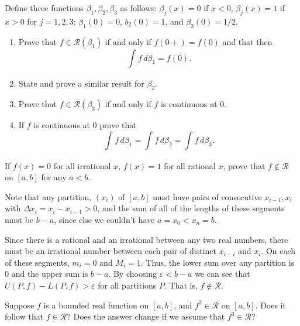 \documentclass[12 pt, letterpaper]{hmcpset}
\begin{document}
\begin{problem}[3.]
	Define three functions  $\beta_{1}, \beta_{2}, \beta_{3}$ as follows: $\beta_{j}(x) = 0$ if $x < 0$, $\beta_{j}(x) = 1$ if $x > 0$ for  $j = 1, 2, 3$; $\beta_{1}(0) = 0$, $b_{2}(0) = 1$, and $\beta_{3}(0) = 1/2$.
	\begin{enumerate}
		\item Prove that $f \in \mathscr{R}(\beta_{1})$ if and only if $f(0+) = f(0)$ and that then
			\[
				\int_{} f \, d\beta_{1} = f(0).
			\]
		\item State and prove a similar result for $\beta_{2}$.
		\item Prove that $f \in \mathscr{R}(\beta_{3})$ if and only if $f$ is continuous at $0$.
		\item If $f$ is continuous at $0$ prove that
			\[
				\int_{} f \, d\beta_{1} = \int_{} f \, d\beta_{2} = \int_{} f \, d\beta_{3}.
			\]
	\end{enumerate}
\end{problem}

\pagebreak

\begin{problem}[4. $\star$]
	If $f(x) = 0$ for all irrational $x$, $f(x) = 1$ for all rational $x$, prove that $f \notin \mathscr{R}$ on $[a, b]$ for any $a < b$.
\end{problem}

\begin{solution}
	Note that any partition, $(x_{i})$ of $[a, b]$ must have pairs of consecutive $x_{i - 1}, x_{i}$ with $\Delta x_{i} = x_{i} - x_{i - 1} > 0$, and the sum of all of the lengths of these segments must be $b - a$, since else we couldn't have $a = x_{0} < x_{n} = b$.

	Since there is a rational and an irrational between any two real numbers, there must be an irrational number between each pair of distinct $x_{i - i}$ and $x_{i}$. On each of these segments, $m_{i} = 0$ and $M_{i} = 1$. Thus, the lower sum over any partition is $0$ and the upper sum is $b - a$. By choosing $\varepsilon < b - a$ we can see that $U(P, f) - L(P, f) > \varepsilon$ for all partitions $P$. That is, $f \notin \mathscr{R}$.
\end{solution}

\pagebreak

\begin{problem}[5. $\star$]
	Suppose $f$ is a bounded real function on $[a, b]$, and $f^{2} \in \mathscr{R}$ on $[a, b]$. Does it follow that $f \in \mathscr{R}$? Does the answer change if we assume that $f^{3} \in \mathscr{R}$?
\end{problem}
\end{document}

